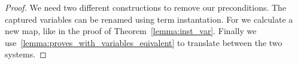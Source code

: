 \begin{corollary}
    \begin{isabelle}
    \end{isabelle}
\end{corollary}
\begin{proof}
    We need two different constructions to remove our preconditions.
    The captured variables can be renamed using term instantation.
    For  we calculate a new map, like in the proof of Theorem~\ref{lemma:inst_var}.
    Finally we use~\ref{lemma:proves_with_variables_eqivalent} to translate between the two systems.
\end{proof}